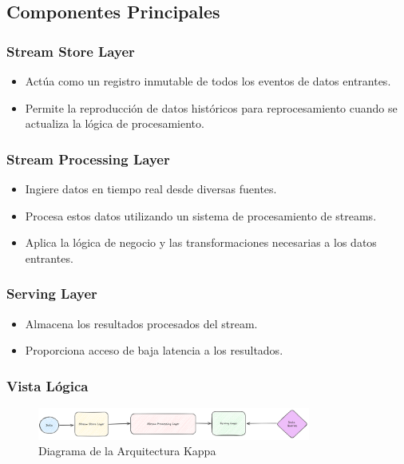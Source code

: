 \subsection{Componentes Principales}

\subsubsection{Stream Store Layer}
\begin{itemize}
    \item Actúa como un registro inmutable de todos los eventos de datos entrantes.
    \item Permite la reproducción de datos históricos para reprocesamiento cuando se actualiza la lógica de procesamiento.
\end{itemize}

\subsubsection{Stream Processing Layer}
\begin{itemize}
    \item Ingiere datos en tiempo real desde diversas fuentes.
    \item Procesa estos datos utilizando un sistema de procesamiento de streams.
    \item Aplica la lógica de negocio y las transformaciones necesarias a los datos entrantes.
\end{itemize}

\subsubsection{Serving Layer}
\begin{itemize}
    \item Almacena los resultados procesados del stream.
    \item Proporciona acceso de baja latencia a los resultados.
\end{itemize}

\newpage
\subsubsection{Vista Lógica}
\begin{figure}[h]
\centering
\includegraphics[width=0.8\textwidth]{teorico/kappa.png}
\caption{Diagrama de la Arquitectura Kappa}
\label{fig:arquitectura_kappa}
\end{figure}

